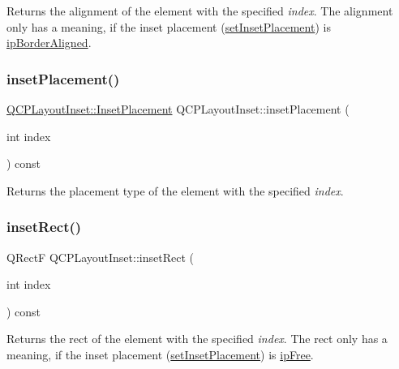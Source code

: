 Returns the alignment of the element with the specified {\itshape index}. The alignment only has a meaning, if the inset placement (\hyperlink{class_q_c_p_layout_inset_a63298830744d5d8c5345511c00fd2144}{set\+Inset\+Placement}) is \hyperlink{class_q_c_p_layout_inset_a8b9e17d9a2768293d2a7d72f5e298192a41ae236f04e42d7098e09fd49dffeb06}{ip\+Border\+Aligned}. \mbox{\label{class_q_c_p_layout_inset_a6fcbd74ebbc45bfe64c604b2791aa57f}} 
\subsubsection{\texorpdfstring{inset\+Placement()}{insetPlacement()}}
{\footnotesize\ttfamily \hyperlink{class_q_c_p_layout_inset_a8b9e17d9a2768293d2a7d72f5e298192}{Q\+C\+P\+Layout\+Inset\+::\+Inset\+Placement} Q\+C\+P\+Layout\+Inset\+::inset\+Placement (\begin{DoxyParamCaption}\item[{int}]{index }\end{DoxyParamCaption}) const}

Returns the placement type of the element with the specified {\itshape index}. \mbox{\label{class_q_c_p_layout_inset_ab23099a46af17c31f4c40668f13c9de1}} 
\subsubsection{\texorpdfstring{inset\+Rect()}{insetRect()}}
{\footnotesize\ttfamily Q\+RectF Q\+C\+P\+Layout\+Inset\+::inset\+Rect (\begin{DoxyParamCaption}\item[{int}]{index }\end{DoxyParamCaption}) const}

Returns the rect of the element with the specified {\itshape index}. The rect only has a meaning, if the inset placement (\hyperlink{class_q_c_p_layout_inset_a63298830744d5d8c5345511c00fd2144}{set\+Inset\+Placement}) is \hyperlink{class_q_c_p_layout_inset_a8b9e17d9a2768293d2a7d72f5e298192a06556307ae5b8255297984219da4e8f4}{ip\+Free}. \mbox{\label{class_q_c_p_layout_inset_a2eeef7ea1b8340e7c7c2e2fc229df5ea}} 

